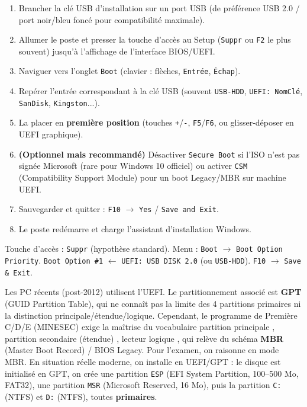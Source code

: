 \documentclass[11pt]{article}
\begin{document}
\begin{methode}
\begin{enumerate}
  \item Brancher la clé USB d'installation sur un port USB (de préférence USB 2.0 / port noir/bleu foncé pour compatibilité maximale).
  \item Allumer le poste et presser la touche d'accès au Setup (\texttt{Suppr} ou \texttt{F2} le plus souvent) jusqu'à l'affichage de l'interface BIOS/UEFI.
  \item Naviguer vers l'onglet \texttt{Boot} (clavier : flèches, \texttt{Entrée}, \texttt{Échap}).
  \item Repérer l'entrée correspondant à la clé USB (souvent \texttt{USB-HDD}, \texttt{UEFI: NomClé}, \texttt{SanDisk}, \texttt{Kingston}...).
  \item La placer en \textbf{première position} (touches \texttt{+}/\texttt{-}, \texttt{F5}/\texttt{F6}, ou glisser-déposer en UEFI graphique).
  \item \textbf{(Optionnel mais recommandé)} Désactiver \texttt{Secure Boot} si l'ISO n'est pas signée Microsoft (rare pour Windows 10 officiel) ou activer \texttt{CSM} (Compatibility Support Module) pour un boot Legacy/MBR sur machine UEFI.
  \item Sauvegarder et quitter : \texttt{F10} $\rightarrow$ \texttt{Yes} / \texttt{Save and Exit}.
  \item Le poste redémarre et charge l'assistant d'installation Windows.
\end{enumerate}
\end{methode}

\begin{exemplebox}
Touche d'accès : \texttt{Suppr} (hypothèse standard). Menu : \texttt{Boot} $\rightarrow$ \texttt{Boot Option Priority}. \texttt{Boot Option \#1} $\leftarrow$ \texttt{UEFI: USB DISK 2.0} (ou \texttt{USB-HDD}). \texttt{F10} $\rightarrow$ \texttt{Save \& Exit}.
\end{exemplebox}

\begin{savaistu}
Les PC récents (post-2012) utilisent l'UEFI. Le partitionnement associé est \textbf{GPT} (GUID Partition Table), qui ne connaît pas la limite des 4 partitions primaires ni la distinction principale/étendue/logique. Cependant, le programme de Première C/D/E (MINESEC) exige la maîtrise du vocabulaire \og partition principale \fg{}, \og partition secondaire (étendue) \fg{}, \og lecteur logique \fg{}, qui relève du schéma \textbf{MBR} (Master Boot Record) / BIOS Legacy. Pour l'examen, on raisonne en mode MBR. En situation réelle moderne, on installe en UEFI/GPT : le disque est initialisé en GPT, on crée une partition \texttt{ESP} (EFI System Partition, 100--500 Mo, FAT32), une partition \texttt{MSR} (Microsoft Reserved, 16 Mo), puis la partition \texttt{C:} (NTFS) et \texttt{D:} (NTFS), toutes \textbf{primaires}.
\end{savaistu}
\end{document}
